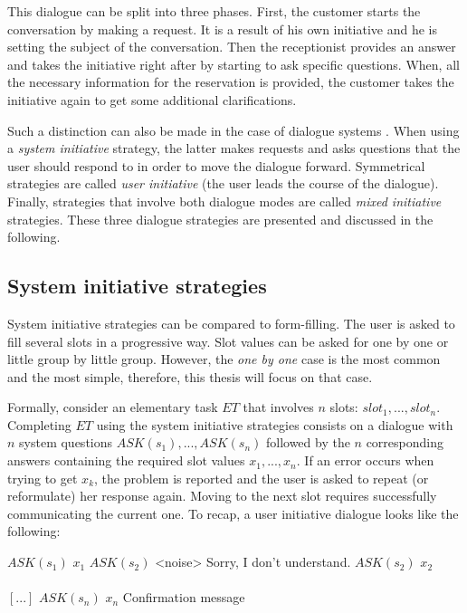 	This dialogue can be split into three phases. First, the customer starts the conversation by making a request. It is a result of his own initiative and he is setting the subject of the conversation. Then the receptionist provides an answer and takes the initiative right after by starting to ask specific questions. When, all the necessary information for the reservation is provided, the customer takes the initiative again to get some additional clarifications.
	
	Such a distinction can also be made in the case of dialogue systems \cite{Ferguson2007}. When using a \textit{system initiative} strategy, the latter makes requests and asks questions that the user should respond to in order to move the dialogue forward. Symmetrical strategies are called \textit{user initiative} (the user leads the course of the dialogue). Finally, strategies that involve both dialogue modes are called \textit{mixed initiative} strategies. These three dialogue strategies are presented and discussed in the following.
	
	\subsection{System initiative strategies}
	
		System initiative strategies can be compared to form-filling. The user is asked to fill several slots in a progressive way. Slot values can be asked for one by one or little group by little group. However, the \textit{one by one} case is the most common and the most simple, therefore, this thesis will focus on that case.
		
		Formally, consider an elementary task $ET$ that involves $n$ slots: $slot_1, ..., slot_n$. Completing $ET$ using the system initiative strategies consists on a dialogue with $n$ system questions $ASK(s_1),...,ASK(s_n)$ followed by the $n$ corresponding answers containing the required slot values $x_1,...,x_n$. If an error occurs when trying to get $x_k$, the problem is reported and the user is asked to repeat (or reformulate) her response again. Moving to the next slot requires successfully communicating the current one. To recap, a user initiative dialogue looks like the following:
		
		\begin{dialogue}
			 $ASK(s_1)$
			 $x_1$
			 $ASK(s_2)$
			 Sorry, I don't understand. $ASK(s_2)$
			 $x_2$ \\ \\ $[...]$
			 $ASK(s_n)$
			 $x_n$
			 Confirmation message
		\end{dialogue}
		
